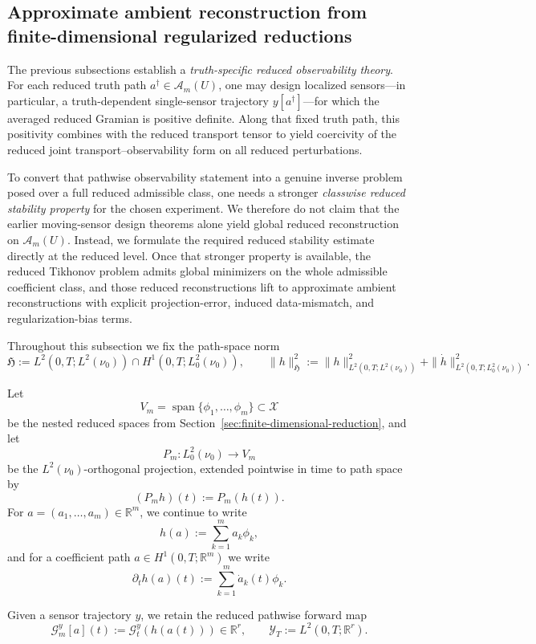 \documentclass{article}
\theoremstyle{definition}
\begin{document}
\subsection{Approximate ambient reconstruction from finite-dimensional regularized reductions}
\label{sec:ambient-approximate-recovery}

The previous subsections establish a \emph{truth-specific reduced observability theory}. For each
reduced truth path \(a^\dagger\in \mathcal A_m(U)\), one may design localized sensors---in
particular, a truth-dependent single-sensor trajectory \(y[a^\dagger]\)---for which the averaged
reduced Gramian is positive definite. Along that fixed truth path, this positivity combines with the
reduced transport tensor to yield coercivity of the reduced joint transport--observability form on
all reduced perturbations.

To convert that pathwise observability statement into a genuine inverse problem posed over a full
reduced admissible class, one needs a stronger \emph{classwise reduced stability property} for the
chosen experiment. We therefore do not claim that the earlier moving-sensor design theorems
alone yield global reduced reconstruction on \(\mathcal A_m(U)\). Instead, we formulate the required
reduced stability estimate directly at the reduced level. Once that stronger property is available,
the reduced Tikhonov problem admits global minimizers on the whole admissible coefficient class,
and those reduced reconstructions lift to approximate ambient reconstructions with explicit
projection-error, induced data-mismatch, and regularization-bias terms.

Throughout this subsection we fix the path-space norm
\[
    \mathfrak H
    :=
    L^2(0,T;L^2(\nu_0))
    \cap
    H^1(0,T;L^2_0(\nu_0)),
    \qquad
    \|h\|_{\mathfrak H}^2
    :=
    \|h\|_{L^2(0,T;L^2(\nu_0))}^2
    +
    \|\dot h\|_{L^2(0,T;L^2_0(\nu_0))}^2.
\]

Let
\[
    V_m=\operatorname{span}\{\phi_1,\dots,\phi_m\}\subset \mathcal X
\]
be the nested reduced spaces from Section~\ref{sec:finite-dimensional-reduction}, and let
\[
    P_m:L^2_0(\nu_0)\to V_m
\]
be the \(L^2(\nu_0)\)-orthogonal projection, extended pointwise in time to path space by
\[
    (P_m h)(t):=P_m(h(t)).
\]
For \(a=(a_1,\dots,a_m)\in\mathbb R^m\), we continue to write
\[
    h(a):=\sum_{k=1}^m a_k\phi_k,
\]
and for a coefficient path \(a\in H^1(0,T;\mathbb R^m)\) we write
\[
    \partial_t h(a)(t):=\sum_{k=1}^m \dot a_k(t)\phi_k.
\]

Given a sensor trajectory \(y\), we retain the reduced pathwise forward map
\[
    \mathcal G_m^y[a](t):=\mathcal G_t^y(h(a(t)))\in \mathbb R^r,
    \qquad
    \mathcal Y_T:=L^2(0,T;\mathbb R^r).
\]
\end{document}
